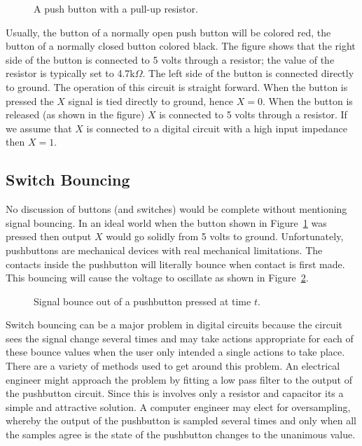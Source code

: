 \begin{figure}[ht]
\caption{A push button with a pull-up resistor.}
\label{fig:commonPeripheralComponentspushbutton}
\end{figure}

Usually, the button of a normally open push button will be colored
red, the button of a normally closed button colored black.
The figure shows that the right side of the button is connected to 
5 volts through a resistor; the value of the resistor is typically
set to 4.7k$\Omega$.  The left side of the button is connected directly 
to ground.  The operation of this circuit is straight forward.  When 
the button is pressed the $X$ signal is tied directly to ground,
hence $X=0$.  When the button is released (as shown in the figure) 
$X$ is connected to 5 volts through a resistor.  If we assume that
$X$ is connected to a digital circuit with a high input impedance 
then $X=1$.  

\subsection{Switch Bouncing}
No discussion of buttons (and switches) would be complete without
mentioning signal bouncing.  In an ideal world when the button
shown in Figure~\ref{fig:commonPeripheralComponentspushbutton} was pressed then output $X$
would go solidly from 5 volts to ground.  Unfortunately, pushbuttons
are mechanical devices with real mechanical limitations.  The contacts
inside the pushbutton will literally bounce when contact is first 
made.  This bouncing will cause the voltage to oscillate as shown
in Figure~\ref{fig:commonPeripheralComponentsbounce}.

\begin{figure}[ht]
\caption{Signal bounce out of a pushbutton pressed at time $t$.}
\label{fig:commonPeripheralComponentsbounce}
\end{figure}

Switch bouncing can be a major problem in digital circuits because
the circuit sees the signal change several times and may take 
actions appropriate for each of these bounce values when the user
only intended a single actions to take place.  There are a variety of
methods used to get around this problem.  An electrical engineer
might approach the problem by fitting a low pass filter to the 
output of the pushbutton circuit.  Since this is involves only a
resistor and capacitor its a simple and attractive solution.  A 
computer engineer may elect for oversampling, whereby the output
of the pushbutton is sampled several times and only when all the
samples agree is the state of the pushbutton changes to the 
unanimous value.



